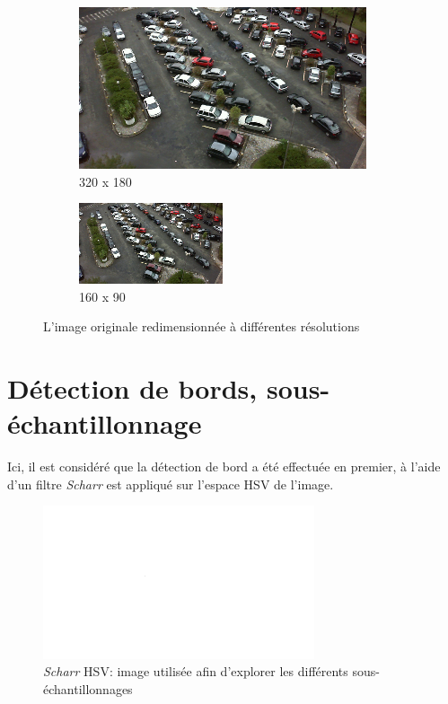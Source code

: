 \begin{appendix}
\begin{figure}[H]
    \bigskip
    \begin{subfigure}{.4\textwidth}
        \centering
        \includegraphics[width=.85\linewidth]{img/conception/image_process/downsample_only/1.png}
        \caption{320 x 180}
    \end{subfigure}%
    \begin{subfigure}{.4\textwidth}
        \centering
        \includegraphics[width=.85\linewidth]{img/conception/image_process/downsample_only/0.png}
        \caption{160 x 90}
    \end{subfigure}%
    \caption{L'image originale redimensionnée à différentes résolutions}
\end{figure}

\section{Détection de bords, sous-échantillonnage} \label{annexe.traitement.edge_down}
Ici, il est considéré que la détection de bord a été effectuée en premier, à l'aide d'un filtre \textit{Scharr} est appliqué sur l'espace HSV de l'image.

\begin{figure}[H]
    \includegraphics[width=80mm]{img/conception/image_process/edges_only/5.png}
    \centering
    \caption{\textit{Scharr} HSV: image utilisée afin d'explorer les différents sous-échantillonnages}
    \label{fig:image_process_edge_down_orig}
\end{figure}


\end{appendix}
